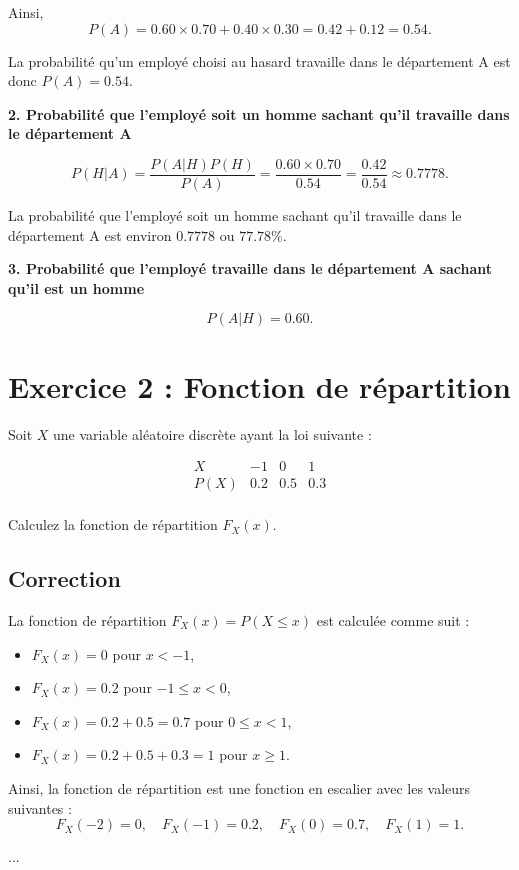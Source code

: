 \documentclass[a4paper,12pt]{article}
\begin{document}
Ainsi,
\[
P(A) = 0.60 \times 0.70 + 0.40 \times 0.30 = 0.42 + 0.12 = 0.54.
\]

La probabilité qu’un employé choisi au hasard travaille dans le département A est donc $P(A) = 0.54$.

\textbf{2. Probabilité que l’employé soit un homme sachant qu’il travaille dans le département A}

\[
P(H | A) = \frac{P(A | H)P(H)}{P(A)} = \frac{0.60 \times 0.70}{0.54} = \frac{0.42}{0.54} \approx 0.7778.
\]

La probabilité que l’employé soit un homme sachant qu’il travaille dans le département A est environ $0.7778$ ou $77.78\%$.

\textbf{3. Probabilité que l’employé travaille dans le département A sachant qu’il est un homme}

\[
P(A | H) = 0.60.
\]

\section*{Exercice 2 : Fonction de répartition}

Soit $X$ une variable aléatoire discrète ayant la loi suivante :

\[
\begin{array}{c|c|c|c}
X & -1 & 0 & 1 \\
\hline
P(X) & 0.2 & 0.5 & 0.3 \\
\end{array}
\]

Calculez la fonction de répartition $F_X(x)$.

\subsection*{Correction}

La fonction de répartition $F_X(x) = P(X \leq x)$ est calculée comme suit :
\begin{itemize}
    \item $F_X(x) = 0$ pour $x < -1$,
    \item $F_X(x) = 0.2$ pour $-1 \leq x < 0$,
    \item $F_X(x) = 0.2 + 0.5 = 0.7$ pour $0 \leq x < 1$,
    \item $F_X(x) = 0.2 + 0.5 + 0.3 = 1$ pour $x \geq 1$.
\end{itemize}

Ainsi, la fonction de répartition est une fonction en escalier avec les valeurs suivantes :
\[
F_X(-2) = 0, \quad F_X(-1) = 0.2, \quad F_X(0) = 0.7, \quad F_X(1) = 1.
\]

...
\end{document}

